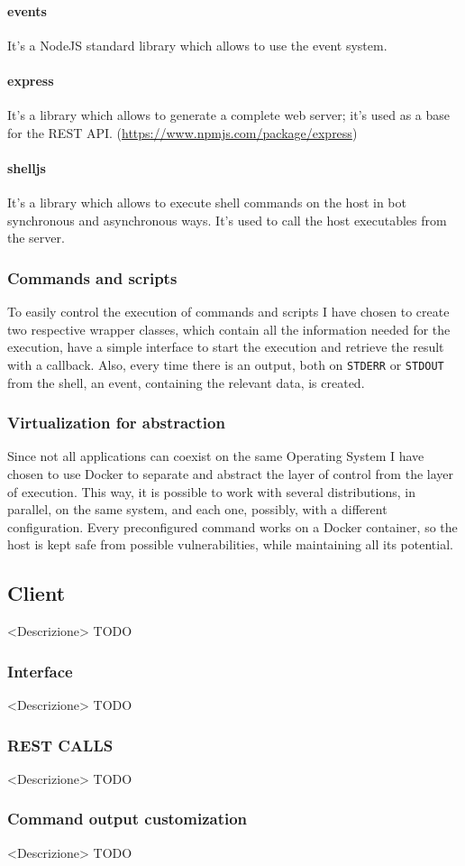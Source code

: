 \documentclass[../PiTest.tex]{subfiles}
\begin{document}
    \paragraph{events}
    It's a NodeJS standard library which allows to use the event system.

    \paragraph{express}
    It's a \npm library which allows to generate a complete web server; it's used as a base for the REST API. (\url{https://www.npmjs.com/package/express})

    \paragraph{shelljs}
    It's a \npm library which allows to execute shell commands on the host in bot synchronous and asynchronous ways. It's used to call the host executables from the server.
    

    \subsubsection{Commands and scripts}
    To easily control the execution of commands and scripts I have chosen to create two respective wrapper classes, which contain all the information needed for the execution, have a simple interface to start the execution and retrieve the result with a callback. Also, every time there is an output, both on \texttt{STDERR} or \texttt{STDOUT} from the shell, an event, containing the relevant data, is created.

    \subsubsection{Virtualization for abstraction}
    Since not all applications can coexist on the same Operating System I have chosen to use Docker to separate and abstract the layer of control from the layer of execution. This way, it is possible to work with several distributions, in parallel, on the same system, and each one, possibly, with a different configuration.
    Every preconfigured command works on a Docker container, so the host is kept safe from possible vulnerabilities, while maintaining all its potential.

    \subsection{Client}
    <Descrizione> TODO

    \subsubsection{Interface}
    <Descrizione> TODO

    \subsubsection{REST CALLS}
    <Descrizione> TODO

    \subsubsection{Command output customization}
    <Descrizione> TODO
\end{document}
